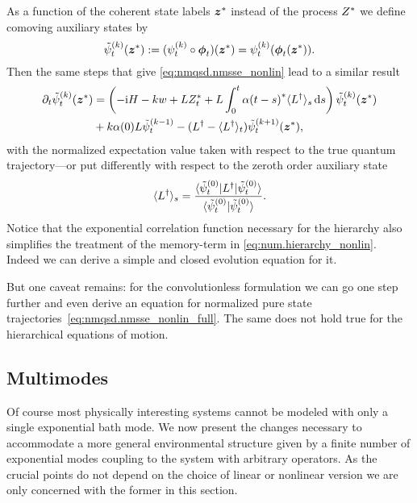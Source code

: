 As a function of the coherent state labels ${\boldsymbol{z}}^*$ instead of the process ${Z}^*$ we define comoving auxiliary states by
\begin{equation*}
  \tilde\psi_t^{(k)}(\cc\zz) := (\psit[k] \circ \vec\phi_t)(\cc\zz) = \psit[k](\vec\phi_t(\cc\zz)).
\end{equation*}
Then the same steps that give \autoref{eq:nmqsd.nmsse_nonlin} lead to a similar result
\begin{align}
  \partial_t \tilde\psi_t^{(k)}({\boldsymbol{z}}^*) &= \left( -\mathrm{i}H - kw + L{Z}^*_t + L \int_0^t {\alpha(t-s)}^* \langle L^\dagger \rangle_s \, \mathrm{d} s \right)\tilde\psi_t^{(k)}({\boldsymbol{z}}^*) \nonumber\\
  &+ k \alpha(0) L \tilde\psi_t^{(k-1)} - (L^\dagger - \langle L^\dagger \rangle_t) \tilde\psi_t^{(k+1)}({\boldsymbol{z}}^*),
  \label{eq:num.hierarchy_nonlin}
\end{align}
with the normalized expectation value taken with respect to the true quantum trajectory---or put differently with respect to the zeroth order auxiliary state
\begin{equation*}
  \langle L^\dagger \rangle_s = \frac{\langle \tilde\psi_t^{(0)} | L^\dagger | \tilde\psi_t^{(0)} \rangle}{\langle \tilde\psi_t^{(0)} | \tilde\psi_t^{(0)} \rangle}.
\end{equation*}
Notice that the exponential correlation function necessary for the hierarchy also simplifies the treatment of the memory-term in \autoref{eq:num.hierarchy_nonlin}.
Indeed we can derive a simple and closed evolution equation for it.

But one caveat remains: for the convolutionless formulation we can go one step further and even derive an equation for normalized pure state trajectories~\ref{eq:nmqsd.nmsse_nonlin_full}.
The same does not hold true for the hierarchical equations of motion.


\subsection{Multimodes}
\label{sub:num.sheom.nonlin}

Of course most physically interesting systems cannot be modeled with only a single exponential bath mode.
We now present the changes necessary to accommodate a more general environmental structure given by a finite number of exponential modes coupling to the system with arbitrary operators.
As the crucial points do not depend on the choice of linear or nonlinear version we are only concerned with the former in this section.

